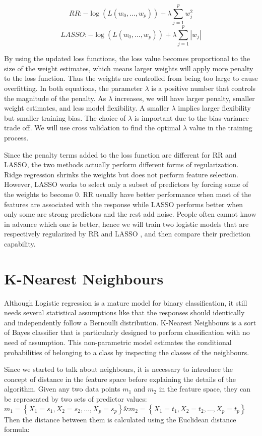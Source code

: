 \documentclass[preprint, 3p,
authoryear]{elsarticle} %
\begin{document}
\[
R R:-\log \left(L\left(w_{0}, \ldots, w_{p}\right)\right)+\lambda \sum_{j=1}^{p} w_{j}^{2}
\] \[
L A S S O:-\log \left(L\left(w_{0}, \ldots, w_{p}\right)\right)+\lambda \sum_{j=1}^{p}\left|w_{j}\right|
\]

By using the updated loss functions, the loss value becomes proportional
to the size of the weight estimates, which means larger weights will
apply more penalty to the loss function. Thus the weights are controlled
from being too large to cause overfitting. In both equations, the
parameter \(\lambda\) is a positive number that controls the magnitude
of the penalty. As \(\lambda\) increases, we will have larger penalty,
smaller weight estimates, and less model flexibility. A smaller
\(\lambda\) implies larger flexibility but smaller training bias. The
choice of \(\lambda\) is important due to the bias-variance trade off.
We will use cross validation to find the optimal \(\lambda\) value in
the training process.

Since the penalty terms added to the loss function are different for RR
and LASSO, the two methods actually perform different forms of
regularization. Ridge regression shrinks the weights but does not
perform feature selection. However, LASSO works to select only a subset
of predictors by forcing some of the weights to become 0. RR usually
have better performance when most of the features are associated with
the response while LASSO performs better when only some are strong
predictors and the rest add noise. People often cannot know in advance
which one is better, hence we will train two logistic models that are
respectively regularized by RR and LASSO , and then compare their
prediction capability.

\hypertarget{k-nearest-neighbours}{%
\section{K-Nearest Neighbours}\label{k-nearest-neighbours}}

Although Logistic regression is a mature model for binary
classification, it still needs several statistical assumptions like that
the responses should identically and independently follow a Bernoulli
distribution. K-Nearest Neighbours is a sort of Bayes classifier that is
particularly designed to perform classification with no need of
assumption. This non-parametric model estimates the conditional
probabilities of belonging to a class by inspecting the classes of the
neighbours.

Since we started to talk about neighbours, it is necessary to introduce
the concept of distance in the feature space before explaining the
details of the algorithm. Given any two data points \(m_{1}\) and
\(m_{2}\) in the feature space, they can be represented by two sets of
predictor values:
\(m_{1}=\left\{X_{1}=s_{1}, X_{2}=s_{2}, \ldots, X_{p}=s_{p}\right\} \& m_{2}=\left\{X_{1}=t_{1}, X_{2}=t_{2}, \ldots, X_{p}=t_{p}\right\}\)\\
Then the distance between them is calculated using the Euclidean
distance formula:
\end{document}
